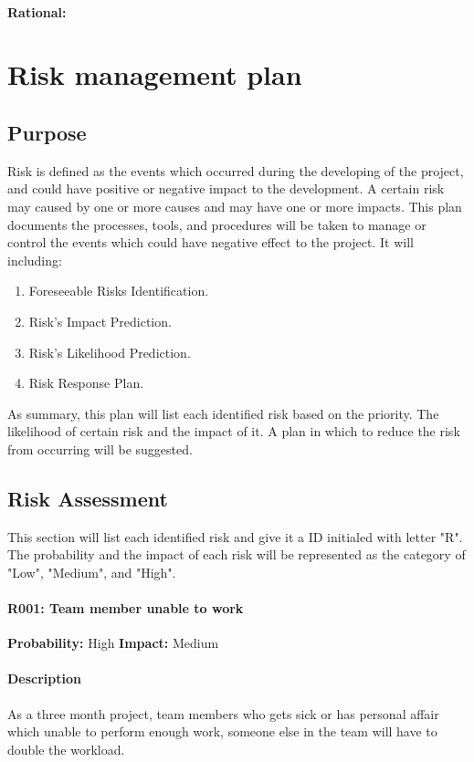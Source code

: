 \documentclass[11pt, a4paper]{report}
\begin{document}
\paragraph{Rational: \\}


\section{Risk management plan}
\subsection{Purpose}
Risk is defined as the events which occurred during the developing of the project, and could have positive or negative impact to the development. A certain risk may caused by one or more causes and may have one or more impacts. This plan documents the processes, tools, and procedures will be taken to manage or control the events which could have negative effect to the project. It will including:
\begin{enumerate}
	\item Foreseeable Risks Identification.
	\item Risk's Impact Prediction.
	\item Risk's Likelihood Prediction.
	\item Risk Response Plan.
\end{enumerate}
As summary, this plan will list each identified risk based on the priority. The likelihood of certain risk and the impact of it. A plan in which to reduce the risk from occurring will be suggested.

\subsection{Risk Assessment}
This section will list each identified risk and give it a ID initialed with letter "R". The probability and the impact of each risk will be represented as the category of "Low", "Medium", and "High". \\




	\paragraph{R001: Team member unable to work} \hspace{1cm} \textbf{Probability: }High\hspace{1cm}   \textbf{Impact: }Medium
	\paragraph{Description}As a three month project, team members who gets sick or has personal affair which unable to perform enough work, someone else in the team will have to double the workload.
\end{document}
